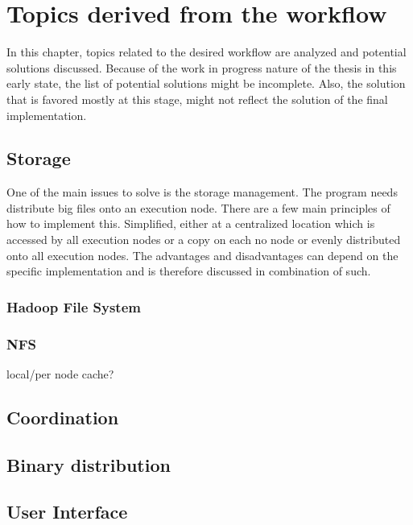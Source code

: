 \chapter{Topics derived from the workflow}

In this chapter, topics related to the desired workflow are analyzed and potential solutions discussed.
Because of the work in progress nature of the thesis in this early state, the list of potential solutions might be incomplete.
Also, the solution that is favored mostly at this stage, might not reflect the solution of the final implementation.

\section{Storage}

One of the main issues to solve is the storage management.
The program needs distribute big files onto an execution node.
There are a few main principles of how to implement this.
Simplified, either at a centralized location which is accessed by all execution nodes or a copy on each no node or evenly distributed onto all execution nodes.
The advantages and disadvantages can depend on the specific implementation and is therefore discussed in combination of such.

\subsection{Hadoop File System}

\subsection{NFS}

local/per node cache?

\section{Coordination}

\section{Binary distribution}

\section{User Interface}




